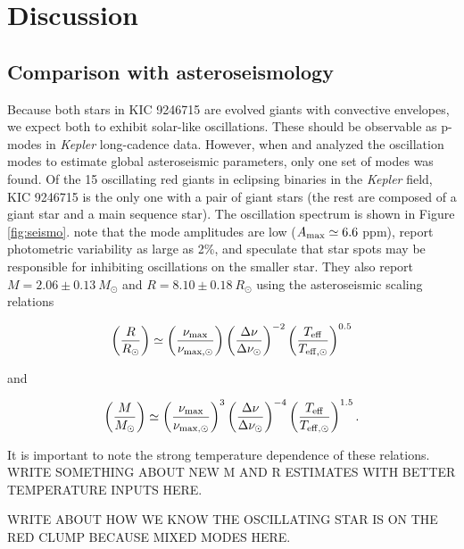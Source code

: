 \section{Discussion}\label{discuss}

\subsection{Comparison with asteroseismology}\label{seismo}

Because both stars in KIC 9246715 are evolved giants with convective envelopes, we expect both to exhibit solar-like oscillations. These should be observable as p-modes in \emph{Kepler} long-cadence data. However, when \citet{gau13} and \citet{gau14} analyzed the oscillation modes to estimate global asteroseismic parameters, only one set of modes was found. Of the 15 oscillating red giants in eclipsing binaries in the \emph{Kepler} field, KIC 9246715 is the only one with a pair of giant stars (the rest are composed of a giant star and a main sequence star). The oscillation spectrum is shown in Figure \ref{fig:seismo}. \citet{gau14} note that the mode amplitudes are low ($A_{\rm{max}} \simeq 6.6$ ppm), report photometric variability as large as 2\%, and speculate that star spots may be responsible for inhibiting oscillations on the smaller star. They also report $M = 2.06 \pm 0.13 \ M_{\odot}$ and $R = 8.10 \pm 0.18 \ R_{\odot}$ using the asteroseismic scaling relations

\begin{equation}
\left( \frac{R}{R_\odot} \right) \simeq \left( \frac{\nu_{\rm{max}}}{\nu_{\rm{max,\odot}}} \right) \left( \frac{\Delta \nu}{\Delta \nu_\odot} \right)^{-2} \left( \frac{T_{\rm{eff}}}{T_{\rm{eff,\odot}}} \right)^{0.5}
\end{equation}

and

\begin{equation}
\left( \frac{M}{M_\odot} \right) \simeq {\left( \frac{\nu_{\rm{max}}}{\nu_{\rm{max,\odot}}} \right)}^{3} \left( \frac{\Delta \nu}{\Delta \nu_\odot} \right)^{-4} \left( \frac{T_{\rm{eff}}}{T_{\rm{eff,\odot}}} \right)^{1.5}.
\end{equation}

It is important to note the strong temperature dependence of these relations. WRITE SOMETHING ABOUT NEW M AND R ESTIMATES WITH BETTER TEMPERATURE INPUTS HERE. 

WRITE ABOUT HOW WE KNOW THE OSCILLATING STAR IS ON THE RED CLUMP BECAUSE MIXED MODES HERE.

